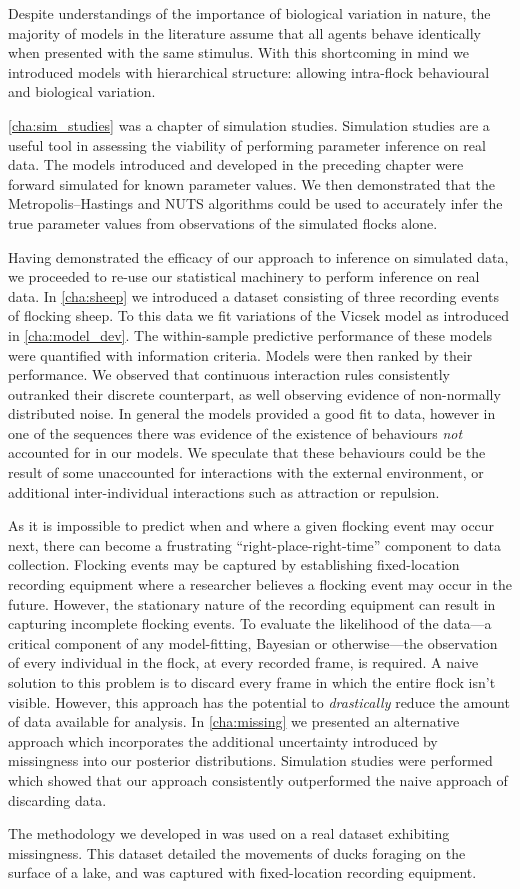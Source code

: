 Despite understandings of the importance of biological variation in nature, the
majority of models in the literature assume that all agents behave identically
when presented with the same stimulus. With this shortcoming in mind we
introduced models with hierarchical structure: allowing intra-flock behavioural
and biological variation.

\cref{cha:sim_studies} was a chapter of simulation studies. Simulation studies
are a useful tool in assessing the viability of performing parameter inference
on real data. The models introduced and developed in the preceding chapter
were forward simulated for known parameter values. We then demonstrated that
the Metropolis--Hastings and NUTS algorithms could be used to accurately infer
the true parameter values from observations of the simulated flocks alone.

Having demonstrated the efficacy of our approach to inference on simulated
data, we proceeded to re-use our statistical machinery to perform inference on
real data. In \cref{cha:sheep} we introduced a dataset consisting of three
recording events of flocking sheep. To this data we fit variations of the
Vicsek model as introduced in \cref{cha:model_dev}. The within-sample
predictive performance of these models were quantified with information
criteria. Models were then ranked by their performance. We observed that
continuous interaction rules consistently outranked their discrete counterpart,
as well observing evidence of non-normally distributed noise. In general the
models provided a good fit to data, however in one of the sequences there was
evidence of the existence of behaviours \emph{not} accounted for in our models.
We speculate that these behaviours could be the result of some unaccounted for
interactions with the external environment, or additional inter-individual
interactions such as attraction or repulsion.

As it is impossible to predict when and where a given flocking event may occur
next, there can become a frustrating ``right-place-right-time'' component to
data collection. Flocking events may be captured by establishing fixed-location
recording equipment where a researcher believes a flocking event may occur in
the future. However, the stationary nature of the recording equipment can
result in capturing incomplete flocking events. To evaluate the likelihood of
the data---a critical component of any model-fitting, Bayesian or
otherwise---the observation of every individual in the flock, at every recorded
frame, is required. A naive solution to this problem is to discard every frame
in which the entire flock isn't visible. However, this approach has the
potential to \emph{drastically} reduce the amount of data available for
analysis. In \cref{cha:missing} we presented an alternative approach which
incorporates the additional uncertainty introduced by missingness into our
posterior distributions. Simulation studies were performed which showed that
our approach consistently outperformed the naive approach of discarding data.

The methodology we developed in  was used on a real dataset
exhibiting missingness. This dataset detailed the movements of ducks
foraging on the surface of a lake, and was captured with fixed-location
recording equipment.




